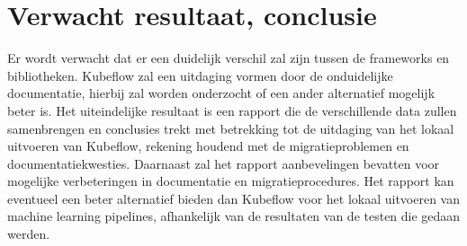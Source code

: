 


\section{Verwacht resultaat, conclusie}%
\label{sec:verwachte_resultaten}
Er wordt verwacht dat er een duidelijk verschil zal zijn tussen de frameworks en bibliotheken. Kubeflow zal een uitdaging vormen door de onduidelijke documentatie, hierbij zal worden onderzocht of een ander alternatief mogelijk beter is.
Het uiteindelijke resultaat is een rapport die de verschillende data zullen samenbrengen en conclusies trekt met betrekking tot de uitdaging van het lokaal uitvoeren van Kubeflow, rekening houdend met de migratieproblemen en documentatiekwesties. Daarnaast zal het rapport aanbevelingen bevatten voor mogelijke verbeteringen in documentatie en migratieprocedures. Het rapport kan eventueel een beter alternatief bieden dan Kubeflow voor het lokaal uitvoeren van machine learning pipelines, afhankelijk van de resultaten van de testen die gedaan werden.



